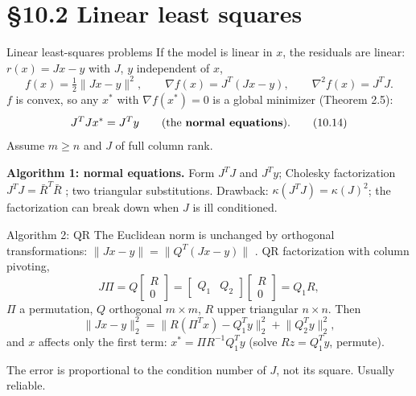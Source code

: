\documentclass[aspectratio=169,12pt]{beamer}
\newcommand{\xs}{x^{*}}
\newcommand{\gradf}{\nabla f}
\newcommand{\hessf}{\nabla^{2} f}
\newcommand{\eqn}[1]{\text{\small(#1)}}
\begin{document}
\section{\S10.2 Linear least squares}

\begin{frame}{Linear least-squares problems}
  If the model is linear in $x$, the residuals are linear: $r(x)=Jx-y$ with $J$, $y$ independent of $x$,
  \[ f(x)=\tfrac12\|Jx-y\|^{2},\qquad \gradf(x)=J^{T}(Jx-y),\qquad \hessf(x)=J^{T}J . \tag{10.13} \]
  $f$ is convex, so any $\xs$ with $\gradf(\xs)=0$ is a global minimizer (Theorem 2.5):
  \[ J^{T}J\xs=J^{T}y \qquad\text{(the \textbf{normal equations})}. \tag{10.14} \]
  Assume $m\ge n$ and $J$ of full column rank.

  \vspace{0.3em}
  \textbf{Algorithm 1: normal equations.} Form $J^{T}J$ and $J^{T}y$; Cholesky factorization
  $J^{T}J=\bar R^{T}\bar R$ \eqn{10.15}; two triangular substitutions.
  Drawback: $\kappa(J^{T}J)=\kappa(J)^{2}$; the factorization can break down when $J$ is ill conditioned.
\end{frame}

\begin{frame}{Algorithm 2: QR}
  The Euclidean norm is unchanged by orthogonal transformations:
  $\|Jx-y\|=\|Q^{T}(Jx-y)\|$ \eqn{10.16}. QR factorization with column pivoting,
  \[ J\Pi=Q\begin{bmatrix}R\\0\end{bmatrix}=\begin{bmatrix}Q_{1}&Q_{2}\end{bmatrix}\begin{bmatrix}R\\0\end{bmatrix}=Q_{1}R, \tag{10.17} \]
  $\Pi$ a permutation, $Q$ orthogonal $m\times m$, $R$ upper triangular $n\times n$. Then
  \[ \|Jx-y\|_{2}^{2}=\big\|R(\Pi^{T}x)-Q_{1}^{T}y\big\|_{2}^{2}+\big\|Q_{2}^{T}y\big\|_{2}^{2}, \tag{10.18} \]
  and $x$ affects only the first term: $\xs=\Pi R^{-1}Q_{1}^{T}y$ (solve $Rz=Q_{1}^{T}y$, permute).

  \vspace{0.3em}
  The error is proportional to the condition number of $J$, not its square. Usually reliable.
\end{frame}
\end{document}
